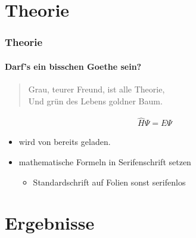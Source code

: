 \documentclass[utf8]{beamer}
\begin{document}
\section{Theorie}


\begin{frame}[t]
\frametitle{Theorie}
\framesubtitle{Darf's ein bisschen Goethe sein?}

\begin{quote}
Grau, teurer Freund, ist alle Theorie,\\
Und grün des Lebens goldner Baum.
\end{quote}

\begin{align*}
\hat{H}\Psi = E\Psi
\end{align*}

\begin{itemize}
\item {} wird von  bereits geladen.
\item mathematische Formeln in \textrm{Serifenschrift} setzen
\begin{itemize}
\item Standardschrift auf Folien sonst serifenlos
\end{itemize}
\end{itemize}

\end{frame}


\section{Ergebnisse}
\end{document}
